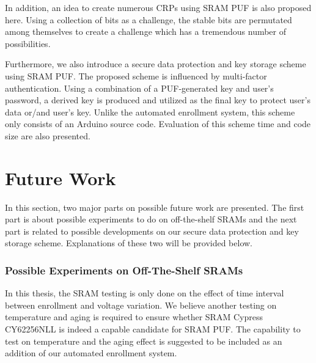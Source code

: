 
In addition, an idea to create numerous CRPs using SRAM PUF is also proposed here. Using a collection of bits as a challenge, the stable bits are permutated among themselves to create a challenge which has a tremendous number of possibilities.

Furthermore, we also introduce a secure data protection and key storage scheme using SRAM PUF. The proposed scheme is influenced by multi-factor authentication. Using a combination of a PUF-generated key and user's password, a derived key is produced and utilized as the final key to protect user's data or/and user's key. Unlike the automated enrollment system, this scheme only consists of an Arduino source code. Evaluation of this scheme time and code size are also presented.


\section{Future Work}

In this section, two major parts on possible future work are presented. The first part is about possible experiments to do on off-the-shelf SRAMs and the next part is related to possible developments on our secure data protection and key storage scheme. Explanations of these two will be provided below.

\subsubsection{Possible Experiments on Off-The-Shelf SRAMs}
In this thesis, the SRAM testing is only done on the effect of time interval between enrollment and voltage variation. We believe another testing on temperature and aging is required to ensure whether SRAM Cypress CY62256NLL is indeed a capable candidate for SRAM PUF. The capability to test on temperature and the aging effect is suggested to be included as an addition of our automated enrollment system.

